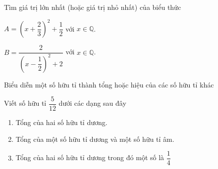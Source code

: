 \begin{vd}%
Tìm giá trị lớn nhất (hoặc giá trị nhỏ nhất) của biểu thức
\begin{enumEX}{2}
\item $A=\left(x+\dfrac{2}{3}\right)^2+\dfrac{1}{2}$ với $x\in\mathbb{Q}$.
\item $B=\dfrac{2}{\left(x-\dfrac{1}{2}\right)^2+2}$ với $x\in\mathbb{Q}$.
\end{enumEX}
\end{vd}

\begin{dang}{Biểu diễn một số hữu tỉ thành tổng hoặc hiệu của các số hữu tỉ khác}
\end{dang}

\begin{vd}%
Viết số hữu tỉ $\dfrac{5}{12}$ dưới các dạng sau đây
\begin{enumerate}
	\item Tổng của hai số hữu tỉ dương.
	\item Tổng của một số hữu tỉ dương và một số hữu tỉ âm.
	\item Tổng của hai số hữu tỉ dương trong đó một số là $\dfrac{1}{4}$
\end{enumerate}
\end{vd}

